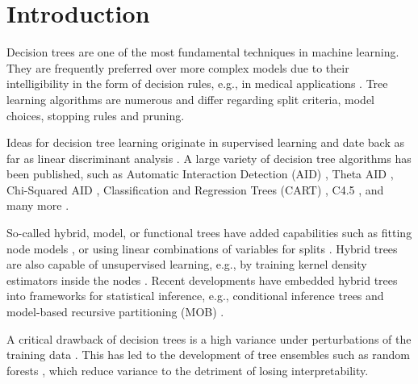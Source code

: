\documentclass[a4paper, 11pt]{article}
\begin{document}
\section{Introduction}

Decision trees are one of the most fundamental techniques in machine learning. They are frequently preferred over more complex models due to their intelligibility in the form of decision rules, e.g., in medical applications \cite{podgorelec_trees_medicine}. Tree learning algorithms are numerous and differ regarding split criteria, model choices, stopping rules and pruning. \par
Ideas for decision tree learning originate in supervised learning and date back as far as linear discriminant analysis \cite{fisher_lda}. A large variety of decision tree algorithms has been published, such as Automatic Interaction Detection (AID) \cite{hawkins_AID}, Theta AID \cite{ messenger_mandell_thaid}, Chi-Squared AID \cite{kass_chaid}, Classification and Regression Trees (CART) \cite{cart_1, hastie_elemstatlearn}, C4.5 \cite{quinlan_c45}, and many more \cite{loh_trees_review}.
\par
So-called hybrid, model, or functional trees \cite{zeileis_mob} have added capabilities such as fitting node models \cite{quinlan_model_tree}, or using linear combinations of variables for splits \cite{brodley_multivariate_trees}. Hybrid trees are also capable of unsupervised learning, e.g., by training kernel density estimators inside the nodes \cite{ram_density_estimation_tree}.
Recent developments have embedded hybrid trees into frameworks for  statistical inference, e.g., conditional inference trees \cite{hothorn_ctree} and model-based recursive partitioning (MOB) \cite{zeileis_mob}.
\par
A critical drawback of decision trees is a high variance under perturbations of the training data \cite{hastie_elemstatlearn}. This has led to the development of tree ensembles such as random forests \cite{breiman_randomforests}, which reduce variance to the detriment of losing interpretability.

\par
\end{document}
